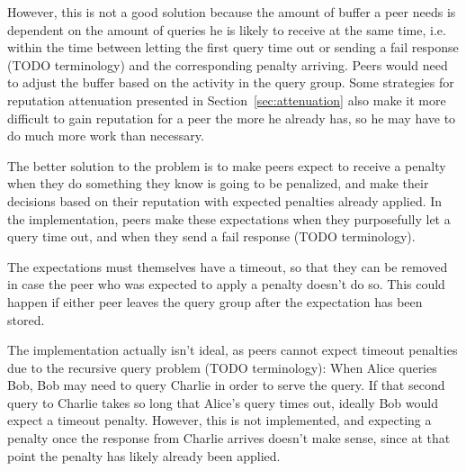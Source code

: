 However, this is not a good solution because the amount of buffer a peer needs
is dependent on the amount of queries he is likely to receive at the same time,
i.e. within the time between letting the first query time out or sending a fail
response (TODO terminology) and the corresponding penalty arriving. Peers would
need to adjust the buffer based on the activity in the query group. Some
strategies for reputation attenuation presented in Section~\ref{sec:attenuation}
also make it more difficult to gain reputation for a peer the more he already
has, so he may have to do much more work than necessary.

The better solution to the problem is to make peers expect to receive a penalty
when they do something they know is going to be penalized, and make their
decisions based on their reputation with expected penalties already applied. In
the implementation, peers make these expectations when they purposefully let a
query time out, and when they send a fail response (TODO terminology).

The expectations must themselves have a timeout, so that they can be removed in
case the peer who was expected to apply a penalty doesn't do so. This could
happen if either peer leaves the query group after the expectation has been
stored.

The implementation actually isn't ideal, as peers cannot expect timeout
penalties due to the recursive query problem (TODO terminology): When Alice
queries Bob, Bob may need to query Charlie in order to serve the query. If that
second query to Charlie takes so long that Alice's query times out, ideally Bob
would expect a timeout penalty. However, this is not implemented, and expecting
a penalty once the response from Charlie arrives doesn't make sense, since at
that point the penalty has likely already been applied.

